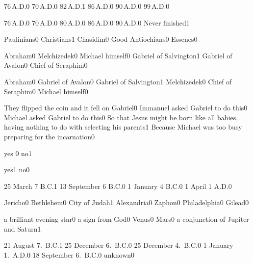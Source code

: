{76\,A.D.}{0}
{70\,A.D.}{0}
{82\,A.D.}{1}
{86\,A.D.}{0}
{90\,A.D.}{0}
{99\,A.D.}{0}
\qstop

{76\,A.D.}{0}
{70\,A.D.}{0}
{80\,A.D.}{0}
{86\,A.D.}{0}
{90\,A.D.}{0}
{Never finished}{1}
\qstop

{Paulinians}{0}
{Christians}{1}
{Chasidim}{0}
{Good Antiochians}{0}
{Essenes}{0}
\qstop


{Abraham}{0}
{Melchizedek}{0}
{Michael himself}{0}
{Gabriel of Salvington}{1}
{Gabriel of Avalon}{0}
{Chief of Seraphim}{0}
\qstop

{Abraham}{0}
{Gabriel of Avalon}{0}
{Gabriel of Salvington}{1}
{Melchizedek}{0}
{Chief of Seraphim}{0}
{Michael himself}{0}
\qstop

{They flipped the coin and it fell on Gabriel}{0}
{Immanuel asked Gabriel to do this}{0}
{Michael asked Gabriel to do this}{0}
{So that Jesus might be born like all babies, having nothing to do with selecting his parents}{1}
{Because Michael was too busy preparing for the incarnation}{0}
\qstop

{yes }{0}
{no}{1}
\qstop

{yes}{1}
{no}{0}
\qstop

{25 March 7 B.C.}{1}
{13 September 6 B.C.}{0}
{1 January 4 B.C.}{0}
{1 April 1 A.D.}{0}
\qstop

{Jericho}{0}
{Bethlehem}{0}
{City of Judah}{1}
{Alexandria}{0}
{Zaphon}{0}
{Philadelphia}{0}
{Gilead}{0}
\qstop

{a brilliant evening star}{0}
{a sign from God}{0}
{Venus}{0}
{Mars}{0}
{a conjunction of Jupiter and Saturn}{1}
\qstop

{21 August 7.~B.C.}{1}
{25 December 6.~B.C.}{0}
{25 December 4.~B.C.}{0}
{1 January 1.~A.D.}{0}
{18 September 6.~B.C.}{0}
{unknown}{0}
\qstop

